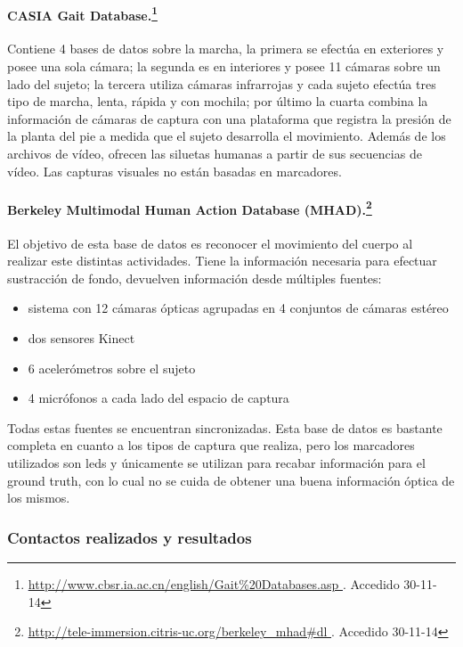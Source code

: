 \paragraph{CASIA Gait Database.\footnote{ \textcolor{blue}{\underline{\url{http://www.cbsr.ia.ac.cn/english/Gait\%20Databases.asp
 }}}. Accedido 30-11-14}} 
Contiene 4 bases de datos sobre la marcha, la primera se efectúa en exteriores y posee una sola cámara; la segunda es en interiores  y posee 11 cámaras sobre un lado del sujeto; la tercera utiliza cámaras infrarrojas y cada sujeto efectúa tres tipo de marcha, lenta, rápida y con mochila; por último la cuarta combina la información de cámaras de captura con una plataforma que registra la presión de la planta del pie a medida que el sujeto desarrolla el movimiento. Además de los archivos de vídeo, ofrecen las siluetas humanas a partir de sus secuencias de vídeo. Las capturas visuales no están basadas en marcadores.

\paragraph{Berkeley Multimodal Human Action Database (MHAD).\footnote{\textcolor{blue}{\underline{\url{http://tele-immersion.citris-uc.org/berkeley_mhad\#dl  }}}. Accedido 30-11-14}}
El objetivo de esta base de datos es reconocer el movimiento del cuerpo al realizar este distintas actividades. Tiene la información necesaria para efectuar sustracción de fondo, devuelven información desde múltiples fuentes:
\begin{itemize}
\item sistema con 12 cámaras ópticas agrupadas en 4 conjuntos de cámaras estéreo
\item dos sensores Kinect
\item 6 acelerómetros sobre el sujeto
\item 4 micrófonos a cada lado del espacio de captura
\end{itemize} Todas estas fuentes se encuentran sincronizadas. Esta base de datos es bastante completa en cuanto a los tipos de captura que realiza, pero los marcadores utilizados son leds y únicamente se utilizan para recabar información para el ground truth, con lo cual no se cuida de obtener una buena información óptica de los mismos. 



\subsubsection{Contactos realizados y resultados}

